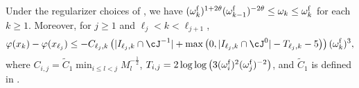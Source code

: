 \begin{lemma}
    \label{lem:proof/iteration-in-a-subsequence}
    Under the regularizer choices of , 
    we have $(\omega_k^{\mathrm{f}})^{1 + 2\theta}(\omega^{\mathrm{f}}_{k-1})^{-2\theta}\leq \omega_k \leq \omega^{\mathrm{f}}_k$ for each %
    $k \ge 1$.
    Moreover, for $j \geq 1$ and $\ell_j  < k < \ell_{j+1}$,
    \begin{align}
        \varphi(x_{k})
        - \varphi(x_{\ell_{j}})
        \leq
         - C_{\ell_j,k}
        \left ( 
            |I_{\ell_j,k} \cap \cJ^{-1} |
            + 
            \max\left ( 0, | I_{\ell_j,k} \cap \cJ^0 | - T_{\ell_j,k} - 5 \right ) 
        \right ) (\omega_k^{\supfallback})^3
         ,
         \label{eqn:inexact-mixed-newton-inner-bound}
    \end{align}
    where $C_{i,j} = \tilde C_1 %
    \min_{i \leq l < j} M_l^{-\frac{1}{2}}$,
    $T_{i,j}=2\log\log\big (3 (\omega_i^{\mathrm{f}})^2 (\omega_j^{\mathrm{f}})^{-2}\big)$, 
    and $\tilde C_1$ is defined in .
\end{lemma}
